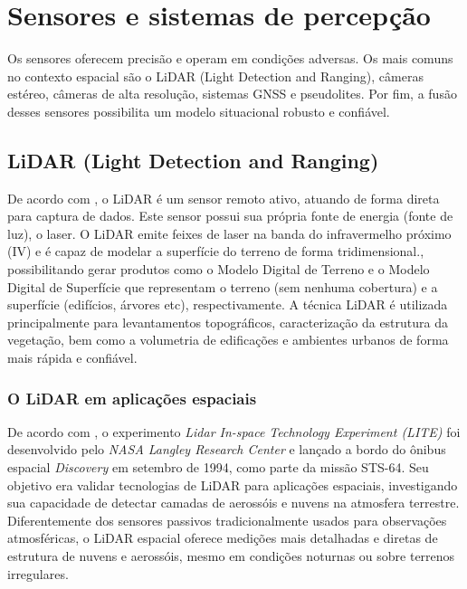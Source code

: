 \section{Sensores e sistemas de percepção}

Os sensores oferecem precisão e operam em condições adversas.
Os mais comuns no contexto espacial são o LiDAR (Light Detection and Ranging), câmeras estéreo, câmeras de alta resolução, sistemas GNSS e pseudolites.
Por fim, a fusão desses sensores possibilita um modelo situacional robusto e confiável.

\subsection{LiDAR (Light Detection and Ranging)}

De acordo com \cite{inpeLidar}, o LiDAR é um sensor remoto ativo, atuando de forma direta para captura de dados.
Este sensor possui sua própria fonte de energia (fonte de luz), o laser.
O LiDAR emite feixes de laser na banda do infravermelho próximo (IV) e é capaz de modelar a superfície do terreno de forma tridimensional., possibilitando gerar produtos como o Modelo Digital de Terreno e o Modelo Digital de Superfície que representam o terreno (sem nenhuma cobertura) e a superfície (edifícios, árvores etc), respectivamente.
A técnica LiDAR é utilizada principalmente para levantamentos topográficos, caracterização da estrutura da vegetação, bem como a volumetria de edificações e ambientes urbanos de forma mais rápida e confiável.

\subsubsection{O LiDAR em aplicações espaciais}

De acordo com \cite{winker1996}, o experimento \emph{Lidar In-space Technology Experiment (LITE)} foi desenvolvido pelo \emph{NASA Langley Research Center} e lançado a bordo do ônibus espacial \emph{Discovery} em setembro de 1994, como parte da missão STS-64.
Seu objetivo era validar tecnologias de LiDAR para aplicações espaciais, investigando sua capacidade de detectar camadas de aerossóis e nuvens na atmosfera terrestre.
Diferentemente dos sensores passivos tradicionalmente usados para observações atmosféricas, o LiDAR espacial oferece medições mais detalhadas e diretas de estrutura de nuvens e aerossóis, mesmo em condições noturnas ou sobre terrenos irregulares.

